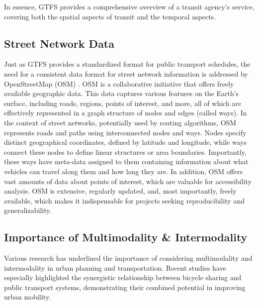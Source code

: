 
In essence, GTFS provides a comprehensive overview of a transit agency's service, covering both the spatial aspects of transit and the temporal aspects.

\subsection{Street Network Data}
\label{subsec:street_network_data}

Just as GTFS provides a standardized format for public transport schedules, the need for a consistent data format for street network information is addressed by OpenStreetMap (OSM) .
OSM is a collaborative initiative that offers freely available geographic data.
This data captures various features on the Earth's surface, including roads, regions, points of interest, and more, all of which are effectively represented in a graph structure of nodes and edges (called ways).
In the context of street networks, potentially used by routing algorithms, OSM represents roads and paths using interconnected nodes and ways.
Nodes specify distinct geographical coordinates, defined by latitude and longitude, while ways connect these nodes to define linear structures or area boundaries.
Importantly, these ways have meta-data assigned to them containing information about what vehicles can travel along them and how long they are.
In addition, OSM offers vast amounts of data about points of interest, which are valuable for accessibility analysis.
OSM is extensive, regularly updated, and, most importantly, freely available, which makes it indispensable for projects seeking reproducibility and generalizability.


\subsection{Importance of Multimodality \& Intermodality}
\label{subsec:importance_of_multimodality_and_intermodality}
Various research has underlined the importance of considering multimodality and intermodality in urban planning and transportation.
Recent studies have especially highlighted the synergistic relationship between bicycle sharing and public transport systems, demonstrating their combined potential in improving urban mobility.

